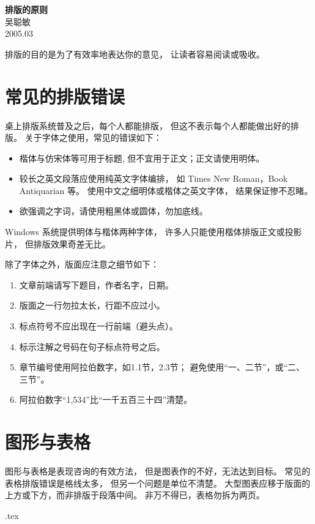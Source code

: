 \documentclass[12pt,a4paper]{article}
\begin{document}
\begin{center}
{\Large \textbf {排版的原则}}\\[5mm] %
吴聪敏\\[2mm]
2005.03
\end{center}

\bigskip %
\fontsize{12}{20pt}\selectfont %
排版的目的是为了有效率地表达你的意见，
让读者容易阅读或吸收。

\section{常见的排版错误}
桌上排版系统普及之后，每个人都能排版，
但这不表示每个人都能做出好的排版。
关于字体之使用，常见的错误如下：
\begin{itemize} %
\item 楷体与仿宋体等可用于标题,
  但不宜用于正文；正文请使用明体。
\item 较长之英文段落应使用纯英文字体编排，
  如 Times New Roman，Book Antiquarian 等。
  使用中文之细明体或楷体之英文字体，
  结果保证惨不忍睹。
\item 欲强调之字词，请使用粗黑体或圆体，勿加底线。
\end{itemize}
Windows 系统提供明体与楷体两种字体，
许多人只能使用楷体排版正文或投影片，
但排版效果奇差无比。

除了字体之外，版面应注意之细节如下：
\begin{enumerate}\itemsep=-2pt %
\item 文章前端请写下题目，作者名字，日期。
\item 版面之一行勿拉太长，行距不应过小。
\item 标点符号不应出现在一行前端（避头点）。
\item 标示注解之号码在句子标点符号之后。
\item 章节编号使用阿拉伯数字，如1.1节，2.3节；
避免使用“一、二节”，或“二、三节”。
\item 阿拉伯数字“1,534”比“一千五百三十四”清楚。
\end{enumerate}

\section{图形与表格}
图形与表格是表现咨询的有效方法，
但是图表作的不好，无法达到目标。
常见的表格排版错误是格线太多，
但另一个问题是单位不清楚。
大型图表应移于版面的上方或下方，而非排版于段落中间。
非万不得已，表格勿拆为两页。

\par\vfill\jobname.tex %
\end{document}
